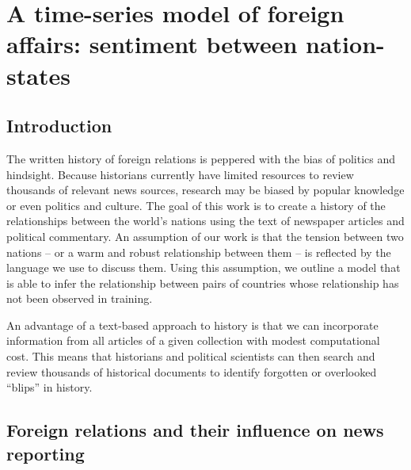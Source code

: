 \chapter{A time-series model of foreign affairs: sentiment between nation-states}

\section*{Introduction}
The written history of foreign relations is peppered with the bias of
politics and hindsight.  Because historians currently have limited
resources to review thousands of relevant news sources, research may
be biased by popular knowledge or even politics and culture. The goal
of this work is to create a history of the relationships between the
world's nations using the text of newspaper articles and political
commentary. An assumption of our work is that the tension between two
nations -- or a warm and robust relationship between them -- is
reflected by the language we use to discuss them. Using this
assumption, we outline a model that is able to infer the relationship
between pairs of countries whose relationship has not been observed in
training.


An advantage of a text-based approach to history is that we can
incorporate information from all articles of a given collection with
modest computational cost.  This means that historians and political
scientists can then search and review thousands of historical
documents to identify forgotten or overlooked ``blips'' in history.



\section{Foreign relations and their influence on news reporting}
\label{section:model}

